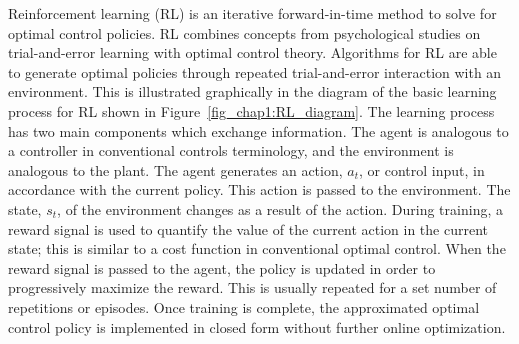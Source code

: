 
Reinforcement learning (RL) is an iterative forward-in-time method to solve for optimal control policies.
RL combines concepts from psychological studies on trial-and-error learning with optimal control theory. Algorithms for RL are able to generate optimal policies through repeated trial-and-error interaction with an environment.
This is illustrated graphically in the diagram of the basic learning process for RL shown in Figure~\ref{fig_chap1:RL_diagram}. The learning process has two main components which exchange information. The agent is analogous to a controller in conventional controls terminology, and the environment is analogous to the plant. The agent generates an action, $a_t$, or control input, in accordance with the current policy. This action is passed to the environment. The state, $s_t$, of the environment changes as a result of the action.
%
During training, a reward signal is used to quantify the value of the current action in the current state; this is similar to a cost function in conventional optimal control. When the reward signal is passed to the agent, the policy is updated in order to progressively maximize the reward.
%
This is usually repeated for a set number of repetitions or episodes.
Once training is complete, the approximated optimal control policy is implemented in closed form without further online optimization.


